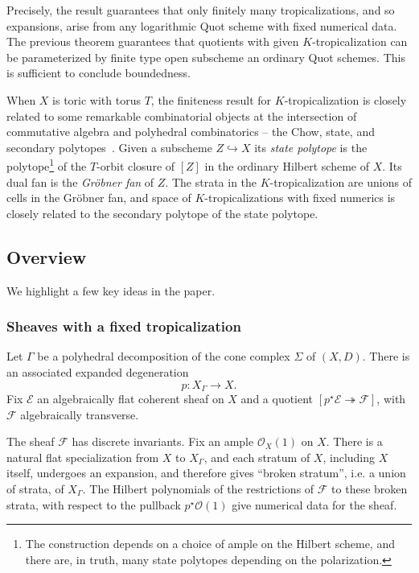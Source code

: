 \documentclass[11pt]{amsart}
\theoremstyle{definition}
\theoremstyle{definition}
\begin{document}
Precisely, the result guarantees that only finitely many tropicalizations, and so expansions, arise from any logarithmic Quot scheme with fixed numerical data. The previous theorem guarantees that quotients with given $K$-tropicalization can be parameterized by finite type open subscheme an ordinary Quot schemes. This is sufficient to conclude boundedness.

When $X$ is toric with torus $T$, the finiteness result for $K$-tropicalization is closely related to some remarkable combinatorial objects at the intersection of commutative algebra and polyhedral combinatorics -- the Chow, state, and secondary polytopes~\cite{KSZ92,Sturmfels96}. Given a subscheme $Z\hookrightarrow X$ its {\it state polytope} is the polytope\footnote{The construction depends on a choice of ample on the Hilbert scheme, and there are, in truth, many state polytopes depending on the polarization.} of the $T$-orbit closure of $[Z]$ in the ordinary Hilbert scheme of $X$. Its dual fan is the {\it Gr\"obner fan} of $Z$. The strata in the $K$-tropicalization are unions of cells in the Gr\"obner fan, and space of $K$-tropicalizations with fixed numerics is closely related to the secondary polytope of the state polytope. 

\subsection{Overview} We highlight a few key ideas in the paper. 

\subsubsection{Sheaves with a fixed tropicalization} Let $\Gamma$ be a polyhedral decomposition of the cone complex $\Sigma$ of $(X,D)$. There is an associated expanded degeneration 
\[
p\colon X_\Gamma\to X.
\]
Fix $\mathcal E$ an algebraically flat coherent sheaf on $X$ and a quotient $[p^\star \mathcal E\twoheadrightarrow \mathcal F]$, with $\mathcal F$ algebraically transverse. 

The sheaf $\mathcal F$ has discrete invariants. Fix an ample $\mathcal O_X(1)$ on $X$. There is a natural flat specialization from $X$ to $X_\Gamma$, and each stratum of $X$, including $X$ itself, undergoes an expansion, and therefore gives ``broken stratum'', i.e. a union of strata, of $X_\Gamma$. The Hilbert polynomials of the restrictions of $\mathcal F$ to these broken strata, with respect to the pullback $p^\star \mathcal O(1)$ give numerical data for the sheaf.
\end{document}

